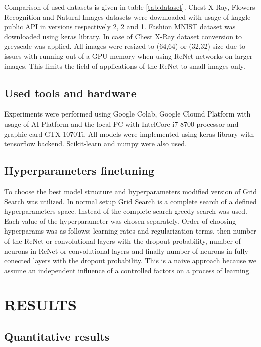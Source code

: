 \documentclass[a4paper, 10 pt, journal]{ieeeconf}
\begin{document}
Comparison of used datasets is given in table \ref{tab:dataset}. Chest X-Ray, Flowers Recognition and Natural Images datasets were downloaded with usage of kaggle public API in versions respectively 2, 2 and 1. Fashion MNIST dataset was downloaded using keras library. In case of Chest X-Ray dataset conversion to greyscale was applied. All images were resized to (64,64) or (32,32) size due to issues with running out of a GPU memory when using ReNet networks on larger images. This limits the field of applications of the ReNet to small images only.

\subsection{Used tools and hardware}

Experiments were performed using Google Colab, Google Clound Platform with usage of AI Platform and the local PC with IntelCore i7 8700 processor and graphic card GTX 1070Ti. All models were implemented using keras library with tensorflow backend. Scikit-learn and numpy were also used.

\subsection{Hyperparameters finetuning}

To choose the best model structure and hyperparameters modified version of Grid Search was utilized. In normal setup Grid Search is a complete search of a defined hyperparameters space. Instead of the complete search greedy search was used. Each value of the hyperparameter was chosen separately. Order of choosing hyperparams was as follows: learning rates and regularization terms, then number of the ReNet or convolutional layers with the dropout probability, number of neurons in ReNet or convolutional layers and finally number of neurons in fully conected layers with the dropout probability. This is a naive approach because we assume an independent influence of a controlled factors on a process of learning. 

\section{RESULTS}

\subsection{Quantitative results}
\end{document}
